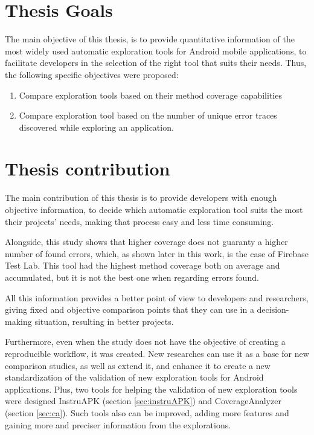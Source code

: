 \section{Thesis  Goals}\label{sec:thesisGoals}

The main objective of this thesis, is to provide quantitative information of the most widely used automatic exploration tools for Android mobile applications, to facilitate developers in the selection of the right tool that suits their needs. Thus, the following specific objectives were proposed:
		\begin{enumerate}
			\item Compare exploration tools  based on their method  coverage capabilities
			\item Compare exploration tool based on the number of unique error traces discovered while exploring an application.
		\end{enumerate}

\section{Thesis contribution} \label{sec:thesisContribution}

The main contribution of this thesis is to provide developers with enough objective information, to decide which automatic exploration tool suits the most their projects' needs, making that process easy and less time consuming.

Alongside, this study shows that higher coverage does not guaranty a higher number of found errors, which, as shown later in this work, is the case of Firebase Test Lab. This tool had the highest method coverage both on average and accumulated, but it is not the best one when regarding errors found. 

All this information provides a better point of view to developers and researchers, giving fixed and objective comparison points that they can use in a decision-making situation, resulting in better projects. 

Furthermore, even when the study does not have the objective of creating a reproducible workflow, it was created. New researches can use it as a base for new comparison studies, as well as extend it, and enhance it to create a new standardization of the validation of new exploration tools for Android applications. Plus, two tools for helping the validation of new exploration tools were designed InstruAPK (section \ref{sec:instruAPK}) and CoverageAnalyzer (section \ref{sec:ca}). Such tools also can be improved, adding more features and gaining more and preciser information from the explorations.
	
